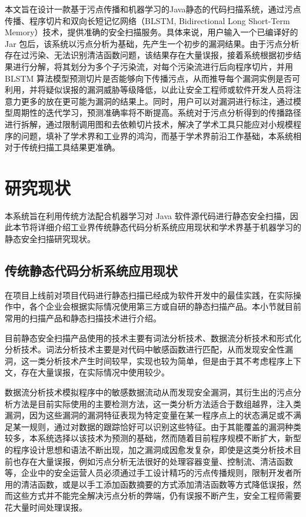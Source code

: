 本文旨在设计一款基于污点传播和机器学习的Java静态的代码扫描系统，通过污点传播、程序切片和双向长短记忆网络（BLSTM, Bidirectional Long Short-Term Memory）技术，提供准确的安全扫描服务。具体来说，用户输入一个已编译好的 Jar 包后，该系统以污点分析为基础，先产生一个初步的漏洞结果。由于污点分析存在过污染、无法识别清洁函数问题，该结果存在大量误报，接着系统根据初步结果进行分解，将其划分为多个子污染流，对每个污染流进行后向程序切片，并用 BLSTM 算法模型预测切片是否能够向下传播污点，从而推导每个漏洞实例是否可利用，并将疑似误报的漏洞威胁等级降低，以此让安全工程师或软件开发人员将注意力更多的放在更可能为漏洞的结果上。同时，用户可以对漏洞进行标注，通过模型周期性的迭代学习，预测准确率将不断提高。系统对于污点分析得到的传播路径进行拆解，通过限制调用图和去依赖切片技术，解决了学术工具只能应对小规模程序的问题，填补了学术界和工业界的鸿沟，而基于学术界前沿工作基础，本系统相对于传统扫描工具结果更准确。

\section{研究现状}
本系统旨在利用传统方法配合机器学习对 Java 软件源代码进行静态安全扫描，因此本节将详细介绍工业界传统静态代码分析系统应用现状和学术界基于机器学习的静态安全扫描研究现状。

\subsection{传统静态代码分析系统应用现状}

在项目上线前对项目代码进行静态扫描已经成为软件开发中的最佳实践，在实际操作中，各个企业会根据实际情况使用第三方或自研的静态扫描产品。本小节就目前常用的扫描产品和静态扫描技术进行介绍。

目前静态安全扫描产品使用的技术主要有词法分析技术、数据流分析技术和形式化分析技术。词法分析技术主要是对代码中敏感函数进行匹配，从而发现安全性漏洞，这一类分析技术产生时间较早，实现也较为简单，但是由于其不考虑程序上下文，存在大量误报，在实际情况中使用较少。

数据流分析技术模拟程序中的敏感数据流动从而发现安全漏洞，其衍生出的污点分析方法是目前实际使用的主要检测方法，这一类分析方法适合于数组越界，注入类漏洞，因为这些漏洞的漏洞特征表现为特定变量在某一程序点上的状态满足或不满足某一规则，通过对数据的跟踪恰好可以识别这些特征。由于其能覆盖的漏洞种类较多，本系统选择以该技术为预测的基础，然而随着目前程序规模不断扩大，新型的程序设计思想和语法不断出现，加之漏洞成因愈发复杂，即使是这类分析技术目前也存在大量误报，例如污点分析无法很好的处理容器变量、控制流、清洁函数等，企业中的安全运营人员必须通过手工设计精巧的污点传播规则，限制开发者所用的清洁函数，或是以手工添加函数摘要的方式添加清洁函数等方式降低误报，然而这些方式并不能完全解决污点分析的弊端，仍有误报不断产生，安全工程师需要花大量时间处理误报。
   
